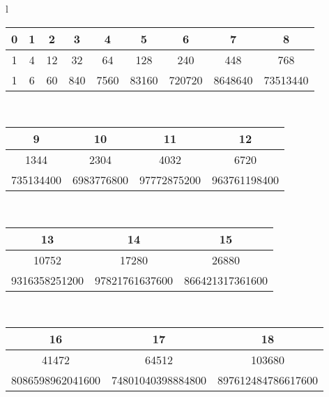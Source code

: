 \begin{center}
\begin{tabular}{l}
\begin{tabular}{c c c c c c c c c}
0 & 1 & 2 & 3 & 4 & 5 & 6 & 7 & 8 \\
\hline
1 & 4 & 12 & 32 & 64 & 128 & 240 & 448 & 768 \\
\hline
\scriptsize{1} & \scriptsize{6} & \scriptsize{60} & \scriptsize{840} & \scriptsize{7560} & \scriptsize{83160} & \scriptsize{720720} & \scriptsize{8648640} & \scriptsize{73513440} \\
\end{tabular}\\[1ex]
\begin{tabular}{c c c c}
9 & 10 & 11 & 12 \\
\hline
1344 & 2304 & 4032 & 6720 \\
\hline
\scriptsize{735134400} & \scriptsize{6983776800} & \scriptsize{97772875200} & \scriptsize{963761198400} \\
\end{tabular}\\[1ex]
\begin{tabular}{c c c}
13 & 14 & 15 \\
\hline
10752 & 17280 & 26880 \\
\hline
\scriptsize{9316358251200} & \scriptsize{97821761637600} & \scriptsize{866421317361600} \\
\end{tabular}\\[1ex]
\begin{tabular}{c c c}
16 & 17 & 18 \\
\hline
41472 & 64512 & 103680 \\
\hline
\scriptsize{8086598962041600} & \scriptsize{74801040398884800} & \scriptsize{897612484786617600} \\
\end{tabular}
\end{tabular}
\end{center}

